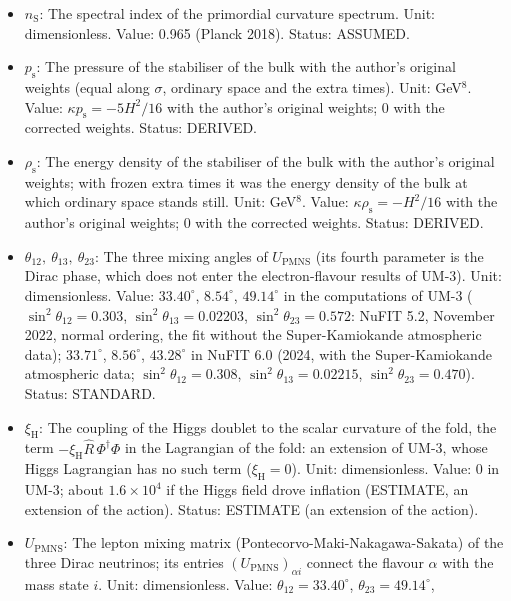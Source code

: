 \documentclass[
  10pt,
]{article}
\begin{document}
\begin{itemize}
\item
  \(n_{\mathrm{S}}\): The spectral index of the primordial curvature
  spectrum. Unit: dimensionless. Value: 0.965 (Planck 2018). Status:
  ASSUMED.
\item
  \(p_{\mathrm{s}}\): The pressure of the stabiliser of the bulk with
  the author's original weights (equal along \(\sigma\), ordinary space
  and the extra times). Unit: GeV\(^8\). Value:
  \(\kappa p_{\mathrm{s}} = -5H^2/16\) with the author's original
  weights; 0 with the corrected weights. Status: DERIVED.
\item
  \(\rho_{\mathrm{s}}\): The energy density of the stabiliser of the
  bulk with the author's original weights; with frozen extra times it
  was the energy density of the bulk at which ordinary space stands
  still. Unit: GeV\(^8\). Value: \(\kappa\rho_{\mathrm{s}} = -H^2/16\)
  with the author's original weights; 0 with the corrected weights.
  Status: DERIVED.
\item
  \(\theta_{12},\ \theta_{13},\ \theta_{23}\): The three mixing angles
  of \(U_{\mathrm{PMNS}}\) (its fourth parameter is the Dirac phase,
  which does not enter the electron-flavour results of UM-3). Unit:
  dimensionless. Value: \(33.40^\circ\), \(8.54^\circ\), \(49.14^\circ\)
  in the computations of UM-3 (\(\sin^2\theta_{12} = 0.303\),
  \(\sin^2\theta_{13} = 0.02203\), \(\sin^2\theta_{23} = 0.572\): NuFIT
  5.2, November 2022, normal ordering, the fit without the
  Super-Kamiokande atmospheric data); \(33.71^\circ\), \(8.56^\circ\),
  \(43.28^\circ\) in NuFIT 6.0 (2024, with the Super-Kamiokande
  atmospheric data; \(\sin^2\theta_{12} = 0.308\),
  \(\sin^2\theta_{13} = 0.02215\), \(\sin^2\theta_{23} = 0.470\)).
  Status: STANDARD.
\item
  \(\xi_{\mathrm{H}}\): The coupling of the Higgs doublet to the scalar
  curvature of the fold, the term
  \(-\xi_{\mathrm{H}}\hat R\,\Phi^\dagger\Phi\) in the Lagrangian of the
  fold: an extension of UM-3, whose Higgs Lagrangian has no such term
  (\(\xi_{\mathrm{H}} = 0\)). Unit: dimensionless. Value: 0 in UM-3;
  about \(1.6\times10^4\) if the Higgs field drove inflation (ESTIMATE,
  an extension of the action). Status: ESTIMATE (an extension of the
  action).
\item
  \(U_{\mathrm{PMNS}}\): The lepton mixing matrix
  (Pontecorvo-Maki-Nakagawa-Sakata) of the three Dirac neutrinos; its
  entries \((U_{\mathrm{PMNS}})_{\alpha i}\) connect the flavour
  \(\alpha\) with the mass state \(i\). Unit: dimensionless. Value:
  \(\theta_{12} = 33.40^\circ\), \(\theta_{23} = 49.14^\circ\),

\end{itemize}
\end{document}
